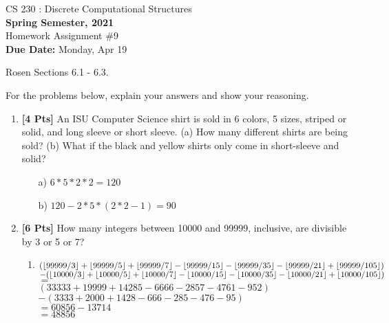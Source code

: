\documentclass[11pt]{article}
\DeclarePairedDelimiter\floor{\lfloor}{\rfloor}
\begin{document}
    \begin{center}
    {{\large CS 230 : Discrete Computational Structures}}
        \\


        {\bf Spring Semester, 2021}\\

        {\sc Homework Assignment \#9}\\
        {\bf Due Date:}  Monday, Apr 19
    \end{center}

     Rosen Sections 6.1 - 6.3.

    For the problems below, explain your answers and show your reasoning.

    \begin{enumerate}

        \item {\bf [4 Pts]} An ISU Computer Science shirt is sold in 6 colors, 5 sizes, striped or solid, and long sleeve or short sleeve. (a) How many different shirts are being sold? (b) What if the black and yellow shirts only come in short-sleeve and solid?
        \begin{enumerate}
            \item[a)] $6*5*2*2 = 120$
            \item[b)] $120 - 2 * 5 * (2*2 - 1) = 90$
        \end{enumerate}

        \item {\bf [6 Pts]} How many integers between 10000 and 99999, inclusive, are divisible by 3 or 5 or 7?
        \begin{enumerate}
                \item $(\floor*{99999/3} + \floor*{99999/5} + \floor*{99999/7} - \floor*{99999/15} - \floor*{99999/35} - \floor*{99999/21} + \floor*{99999/105})$ \\
                      $- (\floor*{10000/3} + \floor*{10000/5} + \floor*{10000/7} - \floor*{10000/15} - \floor*{10000/35} - \floor*{10000/21} + \floor*{10000/105})$ \\
                      $= $ \\
                      $(33333 + 19999 + 14285 - 6666 - 2857 - 4761 - 952)$ \\
                      $- (3333 + 2000 + 1428 - 666 - 285 - 476 - 95)$ \\
                      $= 60856 - 13714$ \\
                      $= 48856$
        \end{enumerate}


\end{enumerate}
\end{document}
